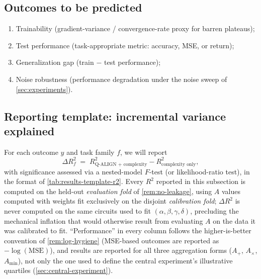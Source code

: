 \documentclass[11pt]{article}
\begin{document}
\subsection{Outcomes to be predicted}
\label{sec:results-outcomes}
\begin{enumerate}[leftmargin=1.6em]
    \item Trainability (gradient-variance / convergence-rate proxy for barren plateaus);
    \item Test performance (task-appropriate metric: accuracy, MSE, or return);
    \item Generalization gap (train $-$ test performance);
    \item Noise robustness (performance degradation under the noise sweep of \cref{sec:experiments}).
\end{enumerate}

\subsection{Reporting template: incremental variance explained}
For each outcome $y$ and task family $f$, we will report
\[
    \Delta R^2_{f} \;=\; R^2_{\text{Q-ALIGN + complexity}} - R^2_{\text{complexity only}},
\]
with significance assessed via a nested-model $F$-test (or likelihood-ratio test), in the format of \cref{tab:results-template-r2}. Every $R^2$ reported in this subsection is computed on the held-out \emph{evaluation fold} of \cref{rem:no-leakage}, using $A$ values computed with weights fit exclusively on the disjoint \emph{calibration fold}; $\Delta R^2$ is never computed on the same circuits used to fit $(\alpha,\beta,\gamma,\delta)$, precluding the mechanical inflation that would otherwise result from evaluating $A$ on the data it was calibrated to fit. ``Performance'' in every column follows the higher-is-better convention of \cref{rem:log-hygiene} (MSE-based outcomes are reported as $-\log(\mathrm{MSE})$), and results are reported for all three aggregation forms ($A_+$, $A_\times$, $A_{\min}$), not only the one used to define the central experiment's illustrative quartiles (\cref{sec:central-experiment}).
\end{document}
